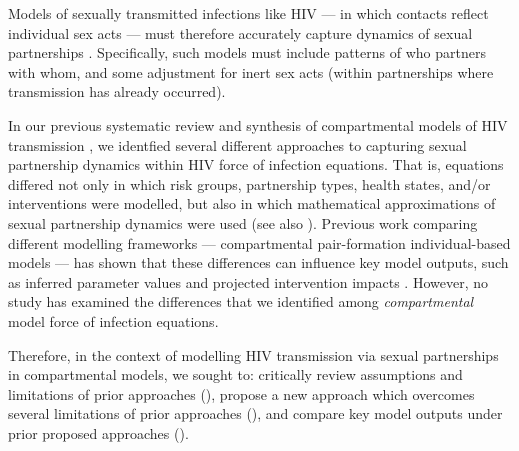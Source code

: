 Models of sexually transmitted infections like HIV
--- in which contacts reflect individual sex acts ---
must therefore accurately capture dynamics of sexual partnerships \cite{Rao2021}.
Specifically, such models must include patterns of who partners with whom, and
some adjustment for inert sex acts (within partnerships where transmission has already occurred).
\par
In our previous systematic review and synthesis of compartmental models of HIV transmission \cite{Knight2022sr},
we identfied several different approaches to capturing sexual partnership dynamics
within HIV force of infection equations.
That is, equations differed not only in which
risk groups, partnership types, health states, and/or interventions were modelled,
but also in which mathematical approximations of sexual partnership dynamics were used
(see also \cite{Rao2021,Johnson2016mf}).
Previous work comparing different modelling frameworks
--- \ie compartmental \vs pair-formation \vs individual-based models ---
has shown that these differences can influence key model outputs,
such as inferred parameter values and projected intervention impacts
\cite{Kretzschmar1998,Eames2002,Lloyd-Smith2004,Johnson2016mf}.
However, no study has examined the differences that we identified
among \emph{compartmental} model force of infection equations.
\par
Therefore, in the context of modelling HIV transmission
via sexual partnerships in compartmental models, we sought to:
critically review assumptions and limitations of prior approaches (),
propose a new approach which overcomes several limitations of prior approaches (),
and compare key model outputs under prior \vs proposed approaches ().
